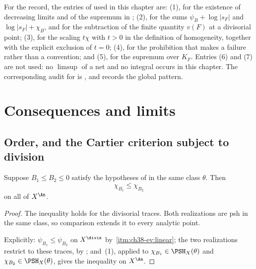 \begin{remark}
\label{rem:ch38-ledger-entries}
For the record, the entries of  used in this
chapter are: (1), for the existence of decreasing limits and of the
supremum in ; (2), for the sums
$\psi_B+\log|s_F|$ and $\log|s_F|+\chi_B$, and for the subtraction of
the finite quantity $v(F)$ at a divisorial point; (3), for the scaling
$t\chi$ with $t>0$ in the definition of homogeneity, together with the
explicit exclusion of $t=0$; (4), for the prohibition that makes
 a failure rather than a convention;
and (5), for the supremum over $K_F$.  Entries (6) and (7) are not used:
no $\limsup$ of a net and no integral occurs in this chapter.  The
corresponding audit for  is
, and
 records the global pattern.
\end{remark}

\section{Consequences and limits}
\label{sec:ch38-consequences}

\subsection{Order, and the Cartier criterion subject to division}
\label{sec:ch38-order}

\begin{corollary}\label{cor:bj-realization-order}
Suppose $B_1\le B_2\le0$ satisfy the hypotheses of
 in the same class $\theta$.  Then
\[
                             \chi_{B_1}\le\chi_{B_2}
\]
on all of $X^{\An}$.
\end{corollary}

\begin{proof}
The inequality holds for the divisorial traces.  Both realizations are psh
in the same class, so comparison extends it to every analytic point.

Explicitly: $\psi_{B_1}\leq\psi_{B_2}$ on $X^{\divis}$ by
\,\cref{itm:ch38-ev:linear}; the two
realizations restrict to these traces, by
; and
\,(1), applied to
$\chi_{B_1}\in\PSH_X(\theta)$ and $\chi_{B_2}\in\PSH_X(\theta)$, gives
the inequality on $X^{\An}$.
\end{proof}


